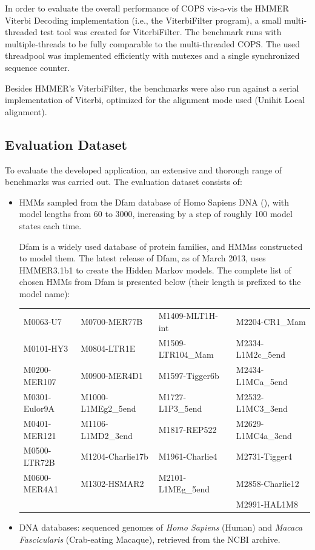 In order to evaluate the overall performance of COPS vis-a-vis the HMMER Viterbi Decoding implementation (i.e., the ViterbiFilter program), a small multi-threaded test tool was created for ViterbiFilter. The benchmark runs with multiple-threads to be fully comparable to the multi-threaded COPS. The used threadpool was implemented efficiently with mutexes and a single synchronized sequence counter.

Besides HMMER's ViterbiFilter, the benchmarks were also run against a serial implementation of Viterbi, optimized for the alignment mode used (Unihit Local alignment).



\subsection{Evaluation Dataset}

To evaluate the developed application, an extensive and thorough range of benchmarks was carried out. The evaluation dataset consists of:

\begin{itemize}

\item HMMs sampled from the Dfam database of Homo Sapiens DNA (\cite{pfam}), with model lengths from 60 to 3000, increasing by a step of roughly 100 model states each time.

Dfam is a widely used database of protein families, and \acp{HMM}s constructed to model them. The latest release of Dfam, as of March 2013, uses HMMER3.1b1 to create the Hidden Markov models. The complete list of chosen HMMs from Dfam is presented below (their length is prefixed to the model name): 

\vspace{1px}
\begin{tabular}{llll}
M0063-U7		& M0700-MER77B			& M1409-MLT1H-int	& M2204-CR1\_Mam	\\
M0101-HY3		& M0804-LTR1E			& M1509-LTR104\_Mam	& M2334-L1M2c\_5end	\\
M0200-MER107	& M0900-MER4D1			& M1597-Tigger6b	& M2434-L1MCa\_5end	\\
M0301-Eulor9A	& M1000-L1MEg2\_5end	& M1727-L1P3\_5end	& M2532-L1MC3\_3end	\\
M0401-MER121	& M1106-L1MD2\_3end		& M1817-REP522		& M2629-L1MC4a\_3end\\
M0500-LTR72B	& M1204-Charlie17b		& M1961-Charlie4	& M2731-Tigger4		\\
M0600-MER4A1	& M1302-HSMAR2			& M2101-L1MEg\_5end	& M2858-Charlie12	\\
				& 						& 					& M2991-HAL1M8		\\
\end{tabular}
\vspace{1px}

\item DNA databases: sequenced genomes of \emph{Homo Sapiens} (Human) and \emph{Macaca Fascicularis} (Crab-eating Macaque), retrieved from the NCBI archive.

\end{itemize}


